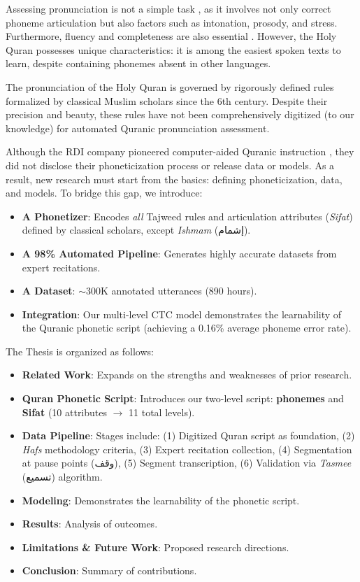 Assessing pronunciation is not a simple task \cite{kheir2023automatic}, as it involves not only correct phoneme articulation but also factors such as intonation, prosody, and stress. Furthermore, fluency and completeness are also essential \cite{kheir2023automatic}. However, the Holy Quran possesses unique characteristics: it is among the easiest spoken texts to learn, despite containing phonemes absent in other languages.

The pronunciation of the Holy Quran is governed by rigorously defined rules formalized by classical Muslim scholars since the 6th century. Despite their precision and beauty, these rules have not been comprehensively digitized (to our knowledge) for automated Quranic pronunciation assessment.

Although the RDI company pioneered computer-aided Quranic instruction \cite{sherif2007enhancing}, they did not disclose their phoneticization process or release data or models. As a result, new research must start from the basics: defining phoneticization, data, and models. To bridge this gap, we introduce:

\begin{itemize}
\item \textbf{A Phonetizer}: Encodes \textit{all} Tajweed rules and articulation attributes (\textit{Sifat}) defined by classical scholars, except \textit{Ishmam} (إشمام).
\item \textbf{A 98\% Automated Pipeline}: Generates highly accurate datasets from expert recitations.
\item \textbf{A Dataset}: $\sim$300K annotated utterances (890 hours).
\item \textbf{Integration}: Our multi-level CTC model demonstrates the learnability of the Quranic phonetic script (achieving a 0.16\% average phoneme error rate).
\end{itemize}

The Thesis is organized as follows:

\begin{itemize}
\item \textbf{Related Work}: Expands on the strengths and weaknesses of prior research.
\item \textbf{Quran Phonetic Script}: Introduces our two-level script: \textbf{phonemes} and \textbf{Sifat} (10 attributes $\rightarrow$ 11 total levels).
\item \textbf{Data Pipeline}: Stages include:  
  (1) Digitized Quran script as foundation,  
  (2) \textit{Hafs} methodology criteria,  
  (3) Expert recitation collection,  
  (4) Segmentation at pause points (وقف),  
  (5) Segment transcription,  
  (6) Validation via \textit{Tasmee} (تسميع) algorithm.  
\item \textbf{Modeling}: Demonstrates the learnability of the phonetic script.
\item \textbf{Results}: Analysis of outcomes.
\item \textbf{Limitations \& Future Work}: Proposed research directions.
\item \textbf{Conclusion}: Summary of contributions.
\end{itemize}
